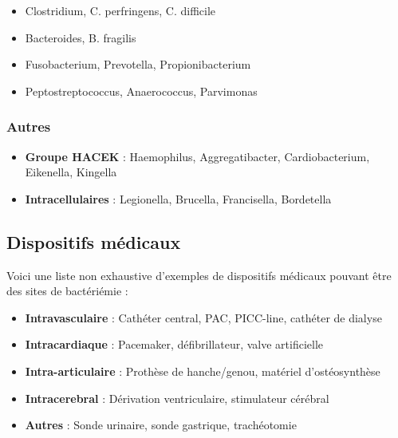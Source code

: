 \begin{itemize}
    \item Clostridium, C. perfringens, C. difficile
    \item Bacteroides, B. fragilis
    \item Fusobacterium, Prevotella, Propionibacterium
    \item Peptostreptococcus, Anaerococcus, Parvimonas
\end{itemize}

\subsubsection{Autres}

\begin{itemize}
    \item \textbf{Groupe HACEK} : Haemophilus, Aggregatibacter, Cardiobacterium, Eikenella, Kingella
    \item \textbf{Intracellulaires} : Legionella, Brucella, Francisella, Bordetella
\end{itemize}

\subsection{Dispositifs médicaux}

Voici une liste non exhaustive d'exemples de dispositifs médicaux pouvant être des sites de bactériémie :

\begin{itemize}
    \item \textbf{Intravasculaire} : Cathéter central, PAC, PICC-line, cathéter de dialyse
    \item \textbf{Intracardiaque} : Pacemaker, défibrillateur, valve artificielle
    \item \textbf{Intra-articulaire} : Prothèse de hanche/genou, matériel d'ostéosynthèse
    \item \textbf{Intracerebral} : Dérivation ventriculaire, stimulateur cérébral
    \item \textbf{Autres} : Sonde urinaire, sonde gastrique, trachéotomie
\end{itemize}

